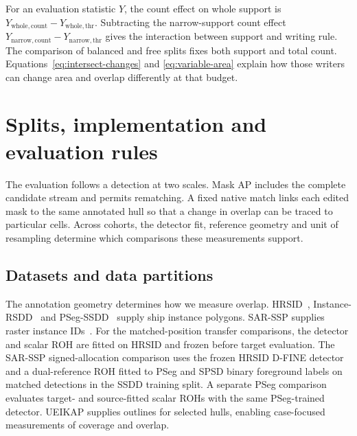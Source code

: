 \documentclass[journal]{IEEEtran}
\begin{document}
For an evaluation statistic \(Y\), the count effect on whole support is \(Y_{\mathrm{whole,count}}-Y_{\mathrm{whole,thr}}\). Subtracting the narrow-support count effect \(Y_{\mathrm{narrow,count}}-Y_{\mathrm{narrow,thr}}\) gives the interaction between support and writing rule. The comparison of balanced and free splits fixes both support and total count. Equations~\eqref{eq:intersect-changes} and \eqref{eq:variable-area} explain how those writers can change area and overlap differently at that budget.

\section{Splits, implementation and evaluation rules}
\label{sec:protocol}

The evaluation follows a detection at two scales. Mask AP includes the complete candidate stream and permits rematching. A fixed native match links each edited mask to the same annotated hull so that a change in overlap can be traced to particular cells. Across cohorts, the detector fit, reference geometry and unit of resampling determine which comparisons these measurements support.

\subsection{Datasets and data partitions}

The annotation geometry determines how we measure overlap. HRSID~\cite{hrsid}, Instance-RSDD~\cite{rsdd} and PSeg-SSDD~\cite{ssdd} supply ship instance polygons. SAR-SSP supplies raster instance IDs~\cite{slgsea}. For the matched-position transfer comparisons, the detector and scalar ROH are fitted on HRSID and frozen before target evaluation. The SAR-SSP signed-allocation comparison uses the frozen HRSID D-FINE detector and a dual-reference ROH fitted to PSeg and SPSD binary foreground labels on matched detections in the SSDD training split. A separate PSeg comparison evaluates target- and source-fitted scalar ROHs with the same PSeg-trained detector. UEIKAP supplies outlines for selected hulls, enabling case-focused measurements of coverage and overlap.
\end{document}
